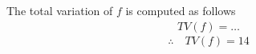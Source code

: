 \documentclass[12pt]{article}
\begin{document}
The total variation of $f$ is computed as follows
\begin{equation}
	\begin{aligned}
		TV(f)  = \dots
	\end{aligned}
\end{equation}
\newline
\newline
\newline
\newline
\newline
\newline
\newline
\newline
\newline
\begin{equation}
	\therefore\quad
	\boxed{
		TV(f) = 14
	}
\end{equation}
\clearpage
\end{document}
